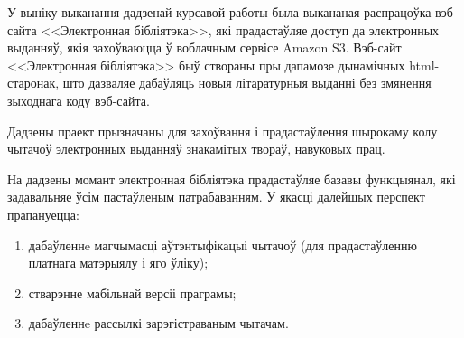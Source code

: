 
У выніку выканання дадзенай курсавой работы была выкананая распрацоўка вэб-сайта <<Электронная бібліятэка>>,
які прадастаўляе доступ да электронных выданняў, якія захоўваюцца ў воблачным сервісе Amazon S3.
Вэб-сайт <<Электронная бібліятэка>> быў створаны пры дапамозе дынамічных html-старонак, што дазваляе
дабаўляць новыя літаратурныя выданні без змянення зыходнага коду вэб-сайта.

Дадзены праект прызначаны для захоўвання і прадастаўлення шырокаму колу чытачоў электронных выданняў
знакамітых твораў, навуковых прац.

На дадзены момант электронная бібліятэка прадастаўляе базавы функцыянал, які задавальняе ўсім
пастаўленым патрабаванням.
У якасці далейшых перспект прапануецца:
\begin{enumerate}
    \item дабаўленнe магчымасці аўтэнтыфікацыі чытачоў (для прадастаўленню платнага матэрыялу і яго ўліку);
    \item стварэнне мабільнай версіі праграмы;
    \item дабаўленнe рассылкі зарэгістраваным чытачам.
\end{enumerate}
